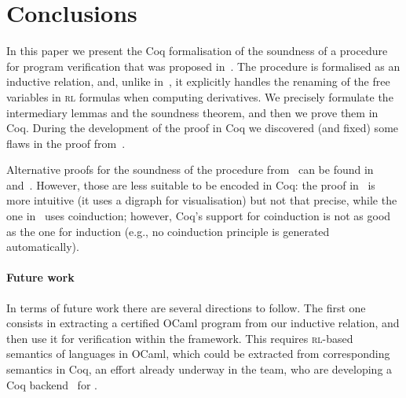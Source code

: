 \documentclass[conference]{IEEEtran}
\newcommand{\RL}{\textsc{rl}\xspace}
\begin{document}
\section{Conclusions}
\label{sec:conclusions}

In this paper we present the Coq formalisation of the soundness of a procedure for program verification that was proposed in~\cite{lucanu-rusu-arusoaie-nowak-LRC2015}.
The procedure is formalised as an inductive relation, and, unlike in~\cite{lucanu-rusu-arusoaie-nowak-LRC2015}, it explicitly handles the renaming of the free variables in \RL formulas when computing derivatives.
We precisely formulate the intermediary lemmas and the soundness theorem, and then we prove them in Coq.
During the development of the proof in Coq we discovered (and fixed) some flaws in the proof from~\cite{lucanu-rusu-arusoaie-nowak-LRC2015}.

Alternative proofs for the soundness of the procedure
from~\cite{lucanu-rusu-arusoaie-nowak-LRC2015} 
can be found in~\cite{festschriftJM15-tr} and~\cite{arusoaie-lucanu-rusu-jsc2015-tr}.
However, those are less suitable to be encoded in Coq: the proof in~\cite{festschriftJM15-tr} is more intuitive (it uses a digraph for visualisation) but not that precise, while the one in~\cite{arusoaie-lucanu-rusu-jsc2015-tr} uses coinduction; however, Coq's support for coinduction is not as good as the one for induction (e.g., no coinduction principle is generated automatically).




\paragraph{Future work}
In terms of future work  there are several directions to follow.
The first one consists in extracting a certified OCaml program from our inductive relation, and then use it for verification within the \K framework. 
This requires \RL-based semantics of languages in OCaml, which could be extracted from corresponding semantics in Coq, an effort already underway in the \K team, who are
developing a Coq backend~\cite{moore-rosu-2015-tr} for \K .
\end{document}
